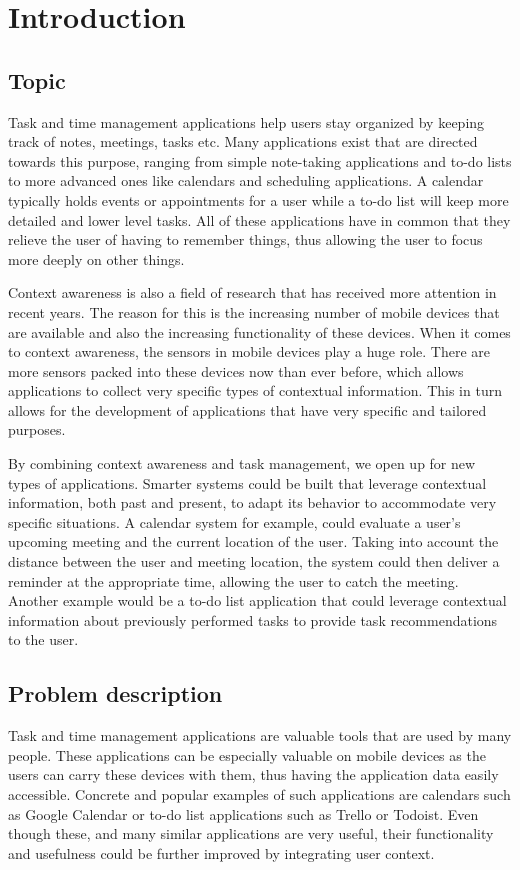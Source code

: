 \chapter{Introduction}
\label{chap:introduction}



\section{Topic}
Task and time management applications help users stay organized by keeping track of notes, meetings, tasks etc. Many applications exist that are directed towards this purpose, ranging from simple note-taking applications and to-do lists to more advanced ones like calendars and scheduling applications. A calendar typically holds events or appointments for a user while a to-do list will keep more detailed and lower level tasks. All of these applications have in common that they relieve the user of having to remember things, thus allowing the user to focus more deeply on other things.

Context awareness is also a field of research that has received more attention in recent years. The reason for this is the increasing number of mobile devices that are available and also the increasing functionality of these devices. When it comes to context awareness, the sensors in mobile devices play a huge role. There are more sensors packed into these devices now than ever before, which allows applications to collect very specific types of contextual information. This in turn allows for the development of applications that have very specific and tailored purposes.

By combining context awareness and task management, we open up for new types of applications. Smarter systems could be built that leverage contextual information, both past and present, to adapt its behavior to accommodate very specific situations. A calendar system for example, could evaluate a user's upcoming meeting and the current location of the user. Taking into account the distance between the user and meeting location, the system could then deliver a reminder at the appropriate time, allowing the user to catch the meeting. Another example would be a to-do list application that could leverage contextual information about previously performed tasks to provide task recommendations to the user.





\section{Problem description}
Task and time management applications are valuable tools that are used by many people. These applications can be especially valuable on mobile devices as the users can carry these devices with them, thus having the application data easily accessible. Concrete and popular examples of such applications are calendars such as Google Calendar\cite{googlecalendar} or to-do list applications such as Trello\cite{trello} or Todoist\cite{todoist}. Even though these, and many similar applications are very useful, their functionality and usefulness could be further improved by integrating user context. 

